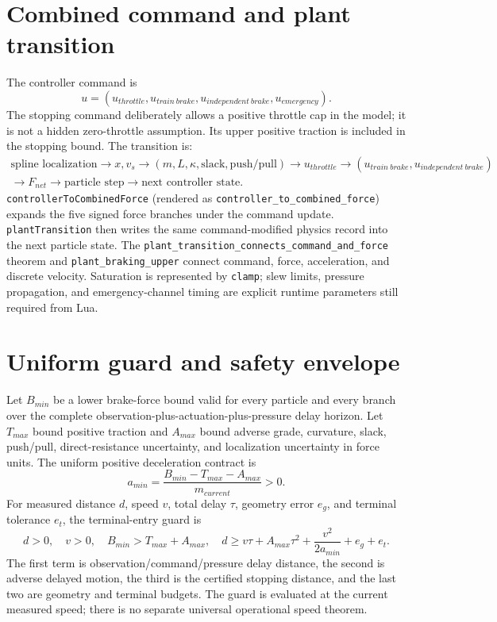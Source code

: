 \documentclass[10pt,a4paper]{article}
\newcommand{\Lean}[1]{\texttt{#1}}
\begin{document}
\section{Combined command and plant transition}

The controller command is
\[
 u=(u_{throttle},u_{train\ brake},u_{independent\ brake},u_{emergency}).
\]
The stopping command deliberately allows a positive throttle cap in the model;
it is not a hidden zero-throttle assumption.  Its upper positive traction is
included in the stopping bound.  The transition is:
\[
 \begin{split}
  \text{spline localization}
  \to x,v_s
  \to (m,L,\kappa,\text{slack},\text{push/pull})
  \to u_{throttle}
  \to (u_{train\ brake},u_{independent\ brake}) \\
  \to F_{net}
  \to \text{particle step}
  \to \text{next controller state}.
 \end{split}
\]
\Lean{controllerToCombinedForce} (rendered as
\Lean{controller\_to\_combined\_force}) expands the five signed force
branches under the command update.  \Lean{plantTransition} then writes the
same command-modified physics record into the next particle state.  The
\Lean{plant\_transition\_connects\_command\_and\_force} theorem and
\Lean{plant\_braking\_upper} connect command, force, acceleration, and
discrete velocity.  Saturation is represented by \Lean{clamp}; slew limits,
pressure propagation, and emergency-channel timing are explicit runtime
parameters still required from Lua.

\section{Uniform guard and safety envelope}

Let $B_{min}$ be a lower brake-force bound valid for every particle and every
branch over the complete observation-plus-actuation-plus-pressure delay
horizon.  Let $T_{max}$ bound positive traction and $A_{max}$ bound adverse
grade, curvature, slack, push/pull, direct-resistance uncertainty, and
localization uncertainty in force units.  The uniform positive deceleration
contract is
\[
 a_{min}=\frac{B_{min}-T_{max}-A_{max}}{m_{current}}>0.
\]
For measured distance $d$, speed $v$, total delay $\tau$, geometry error
$e_g$, and terminal tolerance $e_t$, the terminal-entry guard is
\[
 d>0,\quad v>0,\quad B_{min}>T_{max}+A_{max},\quad
 d\geq v\tau+A_{max}\tau^2
       +\frac{v^2}{2a_{min}}+e_g+e_t.
\]
The first term is observation/command/pressure delay distance, the second is
adverse delayed motion, the third is the certified stopping distance, and the
last two are geometry and terminal budgets.  The guard is evaluated at the
current measured speed; there is no separate universal operational speed
theorem.
\end{document}
